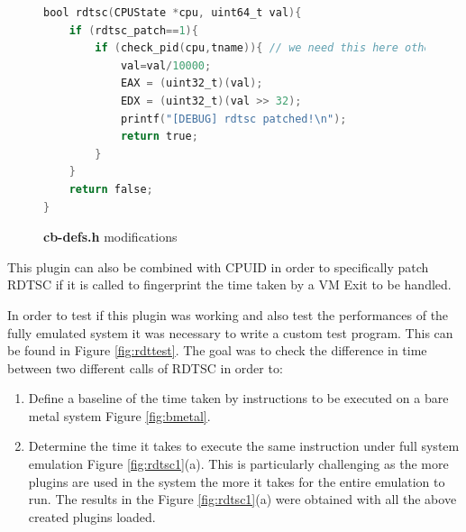 \begin{figure}[htp]
\centering
\begin{lstlisting}[language=C]
bool rdtsc(CPUState *cpu, uint64_t val){
    if (rdtsc_patch==1){
        if (check_pid(cpu,tname)){ // we need this here otherwise it will segfault
            val=val/10000;
            EAX = (uint32_t)(val);
            EDX = (uint32_t)(val >> 32);
            printf("[DEBUG] rdtsc patched!\n");
            return true;
        }
    }
    return false;
}
\end{lstlisting}
\caption{\textbf{cb-defs.h} modifications}
\label{fig:rdtscpatch}
\end{figure}

This plugin can also be combined with CPUID in order to specifically patch RDTSC if it is called to fingerprint the time taken by a VM Exit to be handled. 

In order to test if this plugin was working and also test the performances of the fully emulated system it was necessary to write a custom test program. This can be found in Figure \ref{fig:rdttest}. The goal was to check the difference in time between two different calls of RDTSC in order to:

\begin{enumerate}
    \item Define a baseline of the time taken by instructions to be executed on a bare metal system Figure \ref{fig:bmetal}.
    \item Determine the time it takes to execute the same instruction under full system emulation Figure \ref{fig:rdtsc1}(a). This is particularly challenging as the more plugins are used in the system the more it takes for the entire emulation to run. The results in the Figure \ref{fig:rdtsc1}(a) were obtained with all the above created plugins loaded. 
\end{enumerate}


